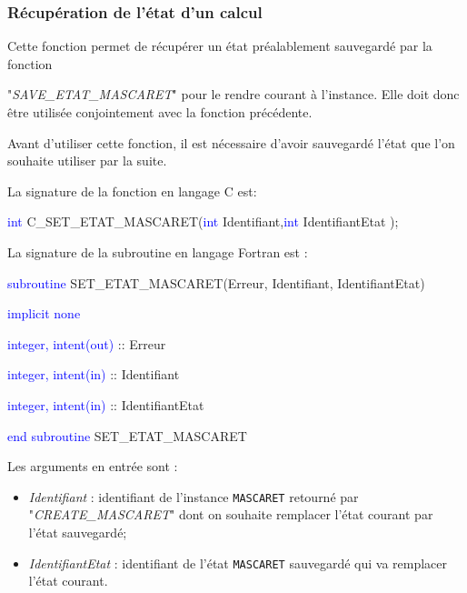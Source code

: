 \documentclass[a4paper,11pt]{article}
\begin{document}
\subsubsection{R\'ecup\'eration de l'\'etat d'un calcul}

 Cette fonction permet de r\'ecup\'erer un \'etat pr\'ealablement sauvegard\'e par la fonction 
 
 "\textit{SAVE\_ETAT\_MASCARET}" pour le rendre courant \`a l'instance.
 Elle doit donc \^etre utilis\'ee conjointement avec la fonction pr\'ec\'edente.
 
 \vspace{0.5cm}
 
 Avant d'utiliser cette fonction, il est n\'ecessaire d'avoir sauvegard\'e l'\'etat que l'on souhaite utiliser par la suite.
 
 \vspace{0.5cm}
 
 La signature de la fonction en langage C est:
 
 \vspace{0.5cm}
 
 \textcolor{blue}{int} C\_SET\_ETAT\_MASCARET(\textcolor{blue}{int} Identifiant,\textcolor{blue}{int} IdentifiantEtat );
 
 \vspace{0.5cm} 
 
 La signature de la subroutine en langage Fortran est :
 
 \vspace{0.5cm}
 
    \textcolor{blue}{subroutine} SET\_ETAT\_MASCARET(Erreur, Identifiant, IdentifiantEtat)
    
        \hspace{1cm}\textcolor{blue}{implicit none}                 
        
        \hspace{1cm} \textcolor{blue}{integer, intent(out)} :: Erreur
        
        \hspace{1cm} \textcolor{blue}{integer, intent(in)}  :: Identifiant
        
        \hspace{1cm} \textcolor{blue}{integer, intent(in)}  :: IdentifiantEtat
        
    \textcolor{blue}{end subroutine} SET\_ETAT\_MASCARET

 \vspace{0.5cm}
 
 Les arguments en entr\'ee sont :
 \vspace{0.5cm}
 \begin{itemize}
    \item \textit{Identifiant} : identifiant de l'instance \texttt{MASCARET} retourn\'e par "\textit{CREATE\_MASCARET}" dont on souhaite remplacer l'\'etat courant par l'\'etat sauvegard\'e;
    \vspace{0.5cm}
    \item \textit{IdentifiantEtat} : identifiant de l'\'etat \texttt{MASCARET} sauvegard\'e qui va remplacer l'\'etat courant.
 \end{itemize}
\end{document}

